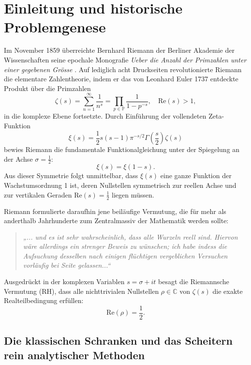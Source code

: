 \documentclass[11pt,a4paper]{article}
\theoremstyle{definition}
\theoremstyle{remark}
\numberwithin{equation}{section}
\begin{document}
\newpage

\section{Einleitung und historische Problemgenese}

Im November 1859 überreichte Bernhard Riemann der Berliner Akademie der Wissenschaften seine epochale Monografie \emph{Ueber die Anzahl der Primzahlen unter einer gegebenen Grösse} \cite{Riemann1859}. Auf lediglich acht Druckseiten revolutionierte Riemann die elementare Zahlentheorie, indem er das von Leonhard Euler 1737 entdeckte Produkt über die Primzahlen
\begin{equation}
\zeta(s) = \sum_{n=1}^\infty \frac{1}{n^s} = \prod_{p \in \mathbb{P}} \frac{1}{1 - p^{-s}}, \quad \mathrm{Re}(s) > 1,
\end{equation}
in die komplexe Ebene fortsetzte. Durch Einführung der vollendeten Zeta-Funktion
\begin{equation}
\xi(s) = \frac{1}{2} s (s-1) \pi^{-s/2} \Gamma\left(\frac{s}{2}\right) \zeta(s)
\end{equation}
bewies Riemann die fundamentale Funktionalgleichung unter der Spiegelung an der Achse $\sigma = \frac{1}{2}$:
\begin{equation}
\xi(s) = \xi(1-s).
\end{equation}
Aus dieser Symmetrie folgt unmittelbar, dass $\xi(s)$ eine ganze Funktion der Wachstumsordnung 1 ist, deren Nullstellen symmetrisch zur reellen Achse und zur vertikalen Geraden $\mathrm{Re}(s) = \frac{1}{2}$ liegen müssen. 

Riemann formulierte daraufhin jene beiläufige Vermutung, die für mehr als anderthalb Jahrhunderte zum Zentralmassiv der Mathematik werden sollte:
\begin{quote}
\emph{„... und es ist sehr wahrscheinlich, dass alle Wurzeln reell sind. Hiervon wäre allerdings ein strenger Beweis zu wünschen; ich habe indess die Aufsuchung desselben nach einigen flüchtigen vergeblichen Versuchen vorläufig bei Seite gelassen...“}
\end{quote}
Ausgedrückt in der komplexen Variablen $s = \sigma + it$ besagt die Riemannsche Vermutung (RH), dass alle nichttrivialen Nullstellen $\rho \in \mathbb{C}$ von $\zeta(s)$ die exakte Realteilbedingung erfüllen:
\begin{equation}
\mathrm{Re}(\rho) = \frac{1}{2}.
\end{equation}

\subsection{Die klassischen Schranken und das Scheitern rein analytischer Methoden}
\end{document}
